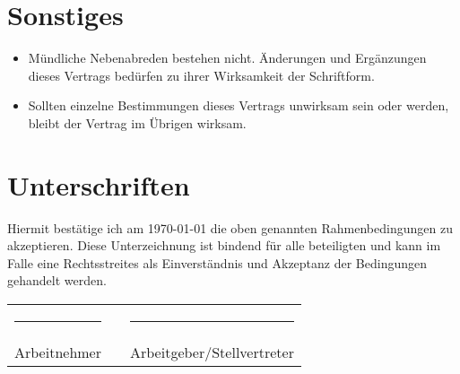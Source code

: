 \documentclass[a4paper,12pt]{article}
\begin{document}
	\section{Sonstiges}
		\begin{itemize}
			\item Mündliche Nebenabreden bestehen nicht. Änderungen und Ergänzungen dieses Vertrags bedürfen zu ihrer Wirksamkeit der Schriftform.
			\item Sollten einzelne Bestimmungen dieses Vertrags unwirksam sein oder werden, bleibt der Vertrag im Übrigen wirksam.			
		\end{itemize}
	\section{Unterschriften}
		Hiermit bestätige ich am \germanDate\today\xspace die oben genannten Rahmenbedingungen zu akzeptieren. Diese Unterzeichnung ist bindend für alle beteiligten und kann im Falle eine Rechtsstreites als Einverständnis und Akzeptanz der Bedingungen gehandelt werden.
		\vspace{2cm}
		
		
		\begin{tabular}{ccc}
			\rule{4cm}{0.4pt} & \hspace{3cm} & \rule{4cm}{0.4pt} \\
			Arbeitnehmer & & Arbeitgeber/Stellvertreter	\\
		\end{tabular}
		
	
\end{document}
